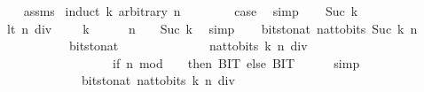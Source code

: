 \begin{isabellebody}
\ \ %
\endisadelimproof
%
\isatagproof
{}\isamarkupfalse%
\ assms\isanewline
{}\isamarkupfalse%
\ {\isacharparenleft}{\kern0pt}induct\ k\ arbitrary{\isacharcolon}{\kern0pt}\ n{\isacharparenright}{\kern0pt}\isanewline
\ \ \isamarkupfalse%
\ {}\isanewline
\ \ \isamarkupfalse%
\ {\isacharquery}{\kern0pt}case\ \isamarkupfalse%
\ simp\isanewline
{}\isamarkupfalse%
\isanewline
\ \ \isamarkupfalse%
\ {\isacharparenleft}{\kern0pt}Suc\ k{\isacharparenright}{\kern0pt}\isanewline
\ \ \isamarkupfalse%
\ lt{\isacharcolon}{\kern0pt}\ {\isachardoublequoteopen}n\ div\ {}\ {\isacharless}{\kern0pt}\ {}\ {\isacharcircum}{\kern0pt}\ k{\isachardoublequoteclose}\isanewline
\ \ \ \ \isamarkupfalse%
\ {\isacartoucheopen}n\ {\isacharless}{\kern0pt}\ {}\ {\isacharcircum}{\kern0pt}\ Suc\ k{\isacartoucheclose}\ \isamarkupfalse%
\ simp\isanewline
\ \ \isamarkupfalse%
\ {\isachardoublequoteopen}bits{\isacharunderscore}{\kern0pt}to{\isacharunderscore}{\kern0pt}nat\ {\isacharparenleft}{\kern0pt}nat{\isacharunderscore}{\kern0pt}to{\isacharunderscore}{\kern0pt}bits\ {\isacharparenleft}{\kern0pt}Suc\ k{\isacharparenright}{\kern0pt}\ n{\isacharparenright}{\kern0pt}\isanewline
\ \ \ \ \ \ \ \ \ \ {\isacharequal}{\kern0pt}\ bits{\isacharunderscore}{\kern0pt}to{\isacharunderscore}{\kern0pt}nat\isanewline
\ \ \ \ \ \ \ \ \ \ \ \ \ \ {\isacharparenleft}{\kern0pt}nat{\isacharunderscore}{\kern0pt}to{\isacharunderscore}{\kern0pt}bits\ k\ {\isacharparenleft}{\kern0pt}n\ div\ {}{\isacharparenright}{\kern0pt}\isanewline
\ \ \ \ \ \ \ \ \ \ \ \ \ \ \ \ \ {\isacharat}{\kern0pt}\ {\isacharbrackleft}{\kern0pt}if\ n\ mod\ {}\ {\isacharequal}{\kern0pt}\ {}\ then\ BIT{}\ else\ BIT{}{\isacharbrackright}{\kern0pt}{\isacharparenright}{\kern0pt}{\isachardoublequoteclose}\isanewline
\ \ \ \ \isamarkupfalse%
\ simp\isanewline
\ \ \isamarkupfalse%
\ \isamarkupfalse%
\ {\isachardoublequoteopen}{\isasymdots}\isanewline
\ \ \ \ \ \ \ \ \ \ {\isacharequal}{\kern0pt}\ {}\ {\isacharasterisk}{\kern0pt}\ bits{\isacharunderscore}{\kern0pt}to{\isacharunderscore}{\kern0pt}nat\ {\isacharparenleft}{\kern0pt}nat{\isacharunderscore}{\kern0pt}to{\isacharunderscore}{\kern0pt}bits\ k\ {\isacharparenleft}{\kern0pt}n\ div\ {}{\isacharparenright}{\kern0pt}{\isacharparenright}{\kern0pt}\isanewline

\end{isabellebody}

